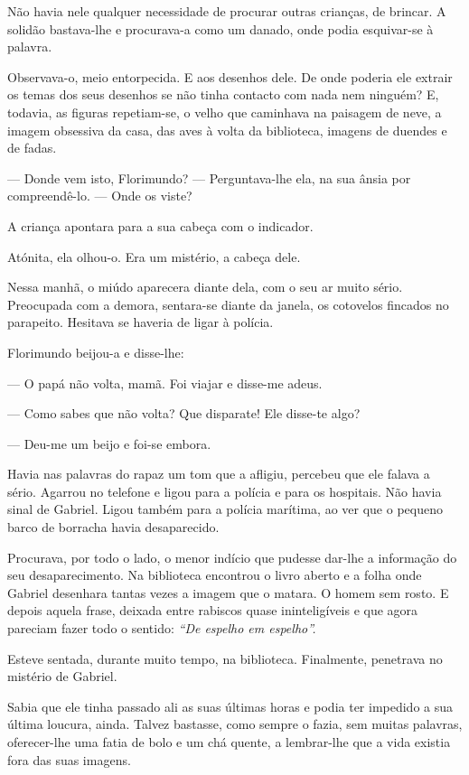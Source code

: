 Não havia nele qualquer necessidade de procurar outras crianças, de
brincar. A solidão bastava-lhe e procurava-a como um danado, onde podia
esquivar-se à palavra.

Observava-o, meio entorpecida. E aos desenhos dele. De onde poderia ele
extrair os temas dos seus desenhos se não tinha contacto com nada nem
ninguém? E, todavia, as figuras repetiam-se, o velho que caminhava na
paisagem de neve, a imagem obsessiva da casa, das aves à volta da
biblioteca, imagens de duendes e de fadas.

--- Donde vem isto, Florimundo? --- Perguntava-lhe ela, na sua ânsia por
compreendê-lo. ---  Onde os viste?

A criança apontara para a sua cabeça com o indicador.

Atónita, ela olhou-o. Era um mistério, a cabeça dele.

Nessa manhã, o miúdo aparecera diante dela, com o seu ar muito sério.
Preocupada com a demora, sentara-se diante da janela, os cotovelos
fincados no parapeito. Hesitava se haveria de ligar à polícia.

Florimundo beijou-a e disse-lhe:

--- O papá não volta, mamã. Foi viajar e disse-me adeus.

--- Como sabes que não volta? Que disparate! Ele disse-te algo?

--- Deu-me um beijo e foi-se embora.

Havia nas palavras do rapaz um tom que a afligiu, percebeu que ele
falava a sério. Agarrou no telefone e ligou para a polícia e para os
hospitais. Não havia sinal de Gabriel. Ligou também para a polícia
marítima, ao ver que o pequeno barco de borracha havia desaparecido.

Procurava, por todo o lado, o menor indício que pudesse dar-lhe a
informação do seu desaparecimento. Na biblioteca encontrou o livro
aberto e a folha onde Gabriel desenhara tantas vezes a imagem que o
matara. O homem sem rosto. E depois aquela frase, deixada entre rabiscos
quase ininteligíveis e que agora pareciam fazer todo o sentido:
\emph{``De espelho em espelho''.}

Esteve sentada, durante muito tempo, na biblioteca. Finalmente,
penetrava no mistério de Gabriel.

Sabia que ele tinha passado ali as suas últimas horas e podia ter
impedido a sua última loucura, ainda. Talvez bastasse, como sempre o
fazia, sem muitas palavras, oferecer-lhe uma fatia de bolo e um chá
quente, a lembrar-lhe que a vida existia fora das suas imagens.

